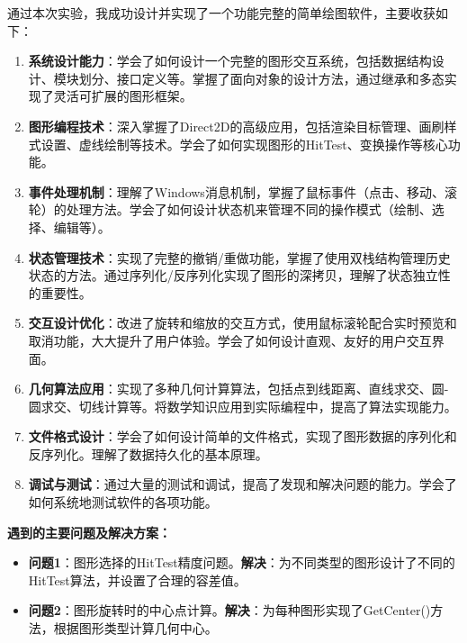 \documentclass[12pt,a4paper]{article}
\begin{document}
\begin{tcolorbox}
通过本次实验，我成功设计并实现了一个功能完整的简单绘图软件，主要收获如下：

\begin{enumerate}
    \item \textbf{系统设计能力}：学会了如何设计一个完整的图形交互系统，包括数据结构设计、模块划分、接口定义等。掌握了面向对象的设计方法，通过继承和多态实现了灵活可扩展的图形框架。
    
    \item \textbf{图形编程技术}：深入掌握了Direct2D的高级应用，包括渲染目标管理、画刷样式设置、虚线绘制等技术。学会了如何实现图形的HitTest、变换操作等核心功能。
    
    \item \textbf{事件处理机制}：理解了Windows消息机制，掌握了鼠标事件（点击、移动、滚轮）的处理方法。学会了如何设计状态机来管理不同的操作模式（绘制、选择、编辑等）。
    
    \item \textbf{状态管理技术}：实现了完整的撤销/重做功能，掌握了使用双栈结构管理历史状态的方法。通过序列化/反序列化实现了图形的深拷贝，理解了状态独立性的重要性。
    
    \item \textbf{交互设计优化}：改进了旋转和缩放的交互方式，使用鼠标滚轮配合实时预览和取消功能，大大提升了用户体验。学会了如何设计直观、友好的用户交互界面。
    
    \item \textbf{几何算法应用}：实现了多种几何计算算法，包括点到线距离、直线求交、圆-圆求交、切线计算等。将数学知识应用到实际编程中，提高了算法实现能力。
    
    \item \textbf{文件格式设计}：学会了如何设计简单的文件格式，实现了图形数据的序列化和反序列化。理解了数据持久化的基本原理。
    
    \item \textbf{调试与测试}：通过大量的测试和调试，提高了发现和解决问题的能力。学会了如何系统地测试软件的各项功能。
\end{enumerate}

\textbf{遇到的主要问题及解决方案：}

\begin{itemize}
    \item \textbf{问题1}：图形选择的HitTest精度问题。\textbf{解决}：为不同类型的图形设计了不同的HitTest算法，并设置了合理的容差值。
    
    \item \textbf{问题2}：图形旋转时的中心点计算。\textbf{解决}：为每种图形实现了GetCenter()方法，根据图形类型计算几何中心。
    

\end{itemize}
\end{tcolorbox}
\end{document}
